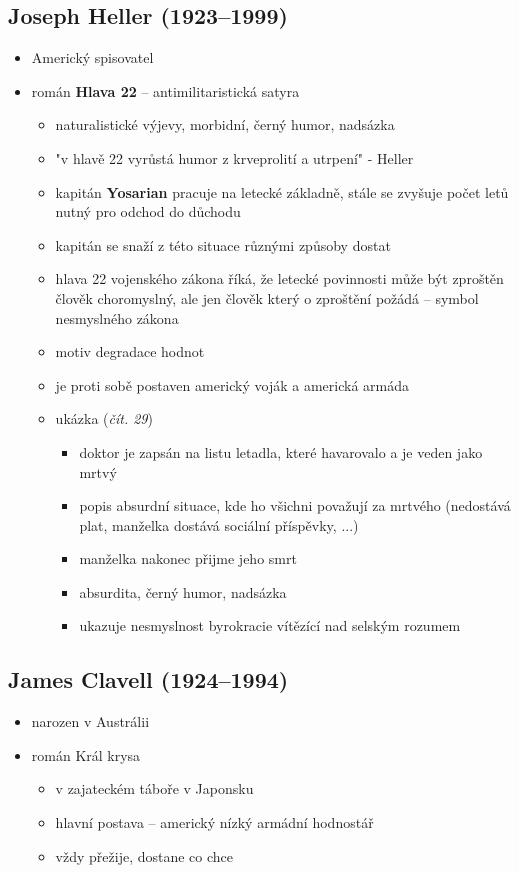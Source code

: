 \subsection{Joseph Heller (1923--1999)}
\begin{itemize}
\item Americký spisovatel 
\item román \textbf{Hlava 22} -- antimilitaristická satyra
	\begin{itemize}
	\item naturalistické výjevy, morbidní, černý humor, nadsázka
	\item "v hlavě 22 vyrůstá humor z krveprolití a utrpení" - Heller
	\item kapitán \textbf{Yosarian} pracuje na letecké základně, stále se zvyšuje počet letů nutný pro odchod do důchodu
	\item kapitán se snaží z této situace různými způsoby dostat
	\item hlava 22 vojenského zákona říká, že letecké povinnosti může být zproštěn člověk choromyslný, ale jen člověk který o zproštění požádá -- symbol nesmyslného zákona
	\item motiv degradace hodnot
	\item je proti sobě postaven americký voják a americká armáda
	\item ukázka (\textit{čít. 29}) 
		\begin{itemize}
		\item doktor je zapsán na listu letadla, které havarovalo a je veden jako mrtvý
		\item popis absurdní situace, kde ho všichni považují za mrtvého (nedostává plat, manželka dostává sociální příspěvky, ...)
		\item manželka nakonec přijme jeho smrt
		\item absurdita, černý humor, nadsázka
		\item ukazuje nesmyslnost byrokracie vítězící nad selským rozumem
		\end{itemize}
	\end{itemize}
\end{itemize}


\subsection{James Clavell (1924--1994)}
\begin{itemize}
\item narozen v Austrálii
\item román Král krysa
	\begin{itemize}
	\item v zajateckém táboře v Japonsku
	\item hlavní postava -- americký nízký armádní hodnostář 
	\item vždy přežije, dostane co chce
	\end{itemize}
\end{itemize}



